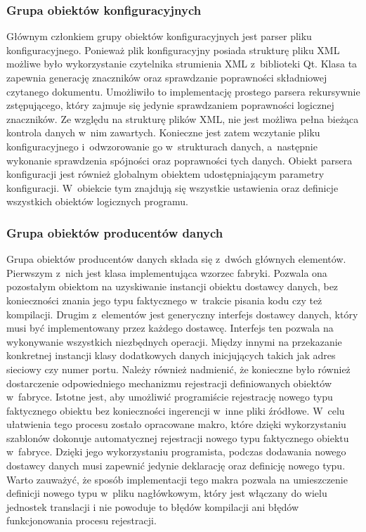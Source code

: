 \subsubsection[Grupa obiektów konfiguracyjnych][Grupa obiektów
konfiguracyjnych]{Grupa obiektów konfiguracyjnych}

Głównym członkiem grupy obiektów konfiguracyjnych jest parser pliku
konfiguracyjnego. Ponieważ plik konfiguracyjny posiada strukturę pliku
XML możliwe było wykorzystanie czytelnika strumienia XML z~biblioteki
Qt. Klasa ta zapewnia generację znaczników oraz sprawdzanie
poprawności składniowej czytanego dokumentu. Umożliwiło to
implementację prostego parsera rekursywnie zstępującego, który zajmuje
się jedynie sprawdzaniem poprawności logicznej znaczników. Ze względu
na strukturę plików XML, nie jest możliwa pełna bieżąca kontrola
danych w~nim zawartych. Konieczne jest zatem wczytanie pliku
konfiguracyjnego i~odwzorowanie go w~strukturach danych, a~następnie
wykonanie sprawdzenia spójności oraz poprawności tych danych. Obiekt
parsera konfiguracji jest również globalnym obiektem udostępniającym
parametry konfiguracji. W~obiekcie tym znajdują się wszystkie
ustawienia oraz definicje wszystkich obiektów logicznych programu.

\subsubsection[Grupa obiektów producentów danych][Grupa obiektów
producentów danych]{Grupa obiektów producentów danych}

Grupa obiektów producentów danych składa się z~dwóch głównych
elementów. Pierwszym z~nich jest klasa implementująca wzorzec
fabryki. Pozwala ona pozostałym obiektom na uzyskiwanie instancji
obiektu dostawcy danych, bez konieczności znania jego typu faktycznego
w~trakcie pisania kodu czy też kompilacji. Drugim z~elementów jest
generyczny interfejs dostawcy danych, który musi być implementowany
przez każdego dostawcę. Interfejs ten pozwala na wykonywanie
wszystkich niezbędnych operacji. Między innymi na przekazanie
konkretnej instancji klasy dodatkowych danych inicjujących takich jak
adres sieciowy czy numer portu. Należy również nadmienić, że konieczne
było również dostarczenie odpowiedniego mechanizmu rejestracji
definiowanych obiektów w~fabryce. Istotne jest, aby umożliwić
programiście rejestrację nowego typu faktycznego obiektu bez
konieczności ingerencji w~inne pliki źródłowe. W~celu ułatwienia tego
procesu zostało opracowane makro, które dzięki wykorzystaniu szablonów
dokonuje automatycznej rejestracji nowego typu faktycznego obiektu
w~fabryce. Dzięki jego wykorzystaniu programista, podczas dodawania
nowego dostawcy danych musi zapewnić jedynie deklarację oraz definicję
nowego typu. Warto zauważyć, że sposób implementacji tego makra
pozwala na umieszczenie definicji nowego typu w~pliku nagłówkowym,
który jest włączany do wielu jednostek translacji i nie powoduje to
błędów kompilacji ani błędów funkcjonowania procesu rejestracji.

